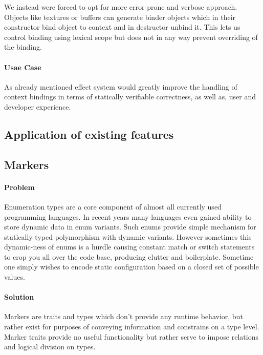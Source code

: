 We instead were forced to opt for more error prone and verbose approach. Objects like textures or buffers can generate binder objects which in their constructor bind object to context and in destructor unbind it.
This lets us control binding using lexical scope but does not in any way prevent overriding of the binding.

\paragraph{Usae Case}

As already mentioned effect system would greatly improve the handling of context bindings in terms of statically verifiable correctness, as well as, user and developer experience.

\subsection{Application of existing features}

\subsection{Markers}

\paragraph{Problem}

Enumeration types are a core component of almost all currently used programming languages. In recent years many languages even gained ability to store dynamic data in enum variants.
Such enums provide simple mechanism for statically typed polymorphism with dynamic variants. 
However sometimes this dynamic-ness of enums is a hurdle causing constant match or switch statements to crop you all over the code base, producing clutter and boilerplate.
Sometime one simply wishes to encode static configuration based on a closed set of possible values.

\paragraph{Solution}

Markers are traits and types which don't provide any runtime behavior, but rather exist for purposes of conveying information and constrains on a type level.
Marker traits provide no useful functionality but rather serve to impose relations and logical division on types.

